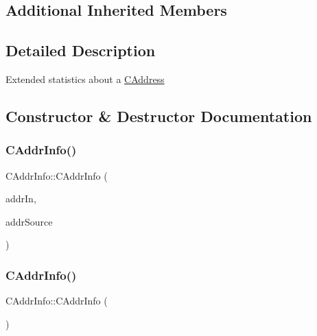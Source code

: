 \subsection*{Additional Inherited Members}


\subsection{Detailed Description}
Extended statistics about a \mbox{\hyperlink{class_c_address}{C\+Address}} 

\subsection{Constructor \& Destructor Documentation}
\mbox{\label{class_c_addr_info_a27e773233e8d7e7d183f138d24cc40ef}} 
\subsubsection{\texorpdfstring{C\+Addr\+Info()}{CAddrInfo()}\hspace{0.1cm}{\footnotesize\ttfamily [1/2]}}
{\footnotesize\ttfamily C\+Addr\+Info\+::\+C\+Addr\+Info (\begin{DoxyParamCaption}\item[{const \mbox{\hyperlink{class_c_address}{C\+Address}} \&}]{addr\+In,  }\item[{const \mbox{\hyperlink{class_c_net_addr}{C\+Net\+Addr}} \&}]{addr\+Source }\end{DoxyParamCaption})\hspace{0.3cm}{\ttfamily [inline]}}

\mbox{\label{class_c_addr_info_ae14c3a91bb669e5580be1d3767264187}} 
\subsubsection{\texorpdfstring{C\+Addr\+Info()}{CAddrInfo()}\hspace{0.1cm}{\footnotesize\ttfamily [2/2]}}
{\footnotesize\ttfamily C\+Addr\+Info\+::\+C\+Addr\+Info (\begin{DoxyParamCaption}{ }\end{DoxyParamCaption})\hspace{0.3cm}{\ttfamily [inline]}}



